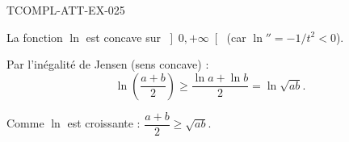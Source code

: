 \begin{corrige}{TCOMPL-ATT-EX-025}

La fonction $\ln$ est concave sur $\left]0, +\infty\right[$ (car $\ln'' = -1/t^2 < 0$).


Par l'inégalité de Jensen (sens concave) :
\[ \ln\!\left(\frac{a+b}{2}\right) \geq \frac{\ln a + \ln b}{2} = \ln\sqrt{ab}. \]

Comme $\ln$ est croissante : $\dfrac{a+b}{2} \geq \sqrt{ab}$.

\end{corrige}
